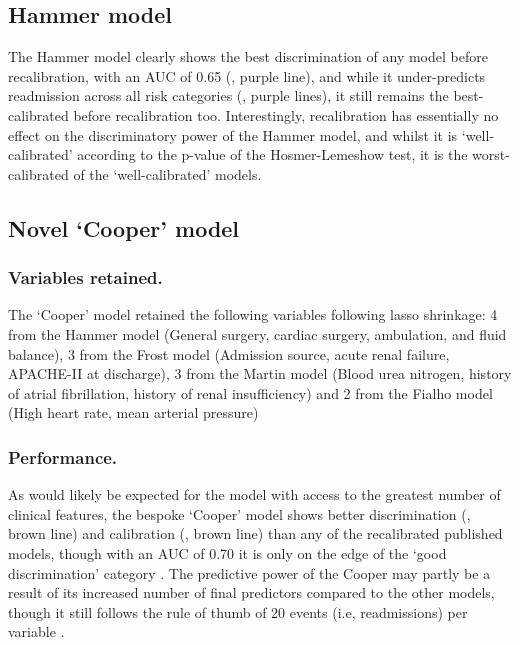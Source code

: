 \documentclass[onecolumn]{article}
\begin{document}
\subsection{Hammer model}

The Hammer model clearly shows the best discrimination of any model before recalibration, with an AUC of 0.65 (, purple line), and while it under-predicts readmission across all risk categories (, purple lines), it still remains the best-calibrated before recalibration too. Interestingly, recalibration has essentially no effect on the discriminatory power of the Hammer model, and whilst it is `well-calibrated' according to the p-value of the Hosmer-Lemeshow test, it is the worst-calibrated of the `well-calibrated' models.

\subsection{Novel `Cooper' model}

\subsubsection*{Variables retained.}

The `Cooper' model retained the following variables following lasso shrinkage: 4 from the Hammer model (General surgery, cardiac surgery, ambulation, and fluid balance), 3 from the Frost model (Admission source, acute renal failure, APACHE-II at discharge), 3 from the Martin model (Blood urea nitrogen, history of atrial fibrillation, history of renal insufficiency) and 2 from the Fialho model (High heart rate, mean arterial pressure)

\subsubsection*{Performance.}

As would likely be expected for the model with access to the greatest number of clinical features, the bespoke `Cooper' model shows better discrimination (, brown line) and calibration (, brown line) than any of the recalibrated published models, though with an AUC of 0.70 it is only on the edge of the `good discrimination' category . The predictive power of the Cooper may partly be a result of its increased number of final predictors compared to the other models, though it still follows the rule of thumb of 20 events (i.e, readmissions) per variable \citep{Austin2017}.
\end{document}
